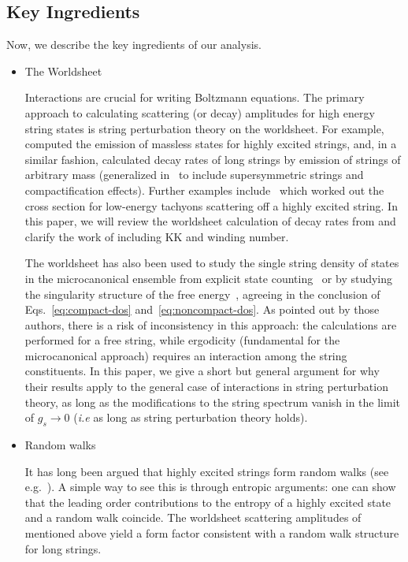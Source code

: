 \documentclass[a4paper,11pt]{article}
\begin{document}
\subsection*{Key Ingredients}

   Now, we describe the key ingredients of our analysis.

\begin{itemize}
    \item The Worldsheet 
    
 Interactions are crucial for writing Boltzmann equations. 
The primary approach to calculating scattering (or decay) amplitudes for high energy string states is string perturbation theory on the worldsheet. For example,~\cite{Amati:1999fv} computed the emission of massless states for highly excited strings, and, in a similar fashion, \cite{Manes:2001cs} calculated decay rates of long strings by emission of strings of arbitrary mass (generalized in~\cite{Chen:2005ra} to include supersymmetric strings and compactification effects). 
Further examples include~\cite{Manes:2003mw,Manes:2004nd} which worked out the cross section for low-energy tachyons scattering off a highly excited string. In this paper, we will review the worldsheet calculation of decay rates from \cite{Manes:2001cs} and clarify the work of \cite{Chen:2005ra} including KK and winding number.


The worldsheet has also been used to study the  single string density of states in the microcanonical ensemble from explicit state counting~\cite{Mitchell:1987th} or by studying the singularity structure of the free energy~\cite{Deo:1988jj,Deo:1989bv,Deo:1991mp}, agreeing in the conclusion of Eqs.~\eqref{eq:compact-dos} and~\eqref{eq:noncompact-dos}. As pointed out by those authors, there is a risk of inconsistency in this approach: the calculations are performed for a free string, while ergodicity (fundamental for the microcanonical approach) requires an interaction among the string constituents. In this paper, we give a short but general argument for why their results apply to the general case of interactions in string perturbation theory, as long as the modifications to the  string spectrum vanish in the limit of $g_s \to 0$ (\textit{i.e} as long as string perturbation theory holds). 

    \item Random walks

    It has long been argued that highly excited strings form random walks (see e.g.~\cite{Mitchell:1987th}).
    A simple way to see this is through entropic arguments: one can show that the leading order contributions to the entropy of a highly excited state and a random walk coincide.
The worldsheet scattering amplitudes of~\cite{Manes:2003mw,Manes:2004nd} mentioned above yield a form factor consistent with a random walk structure for long strings.
    

\end{itemize}
\end{document}
